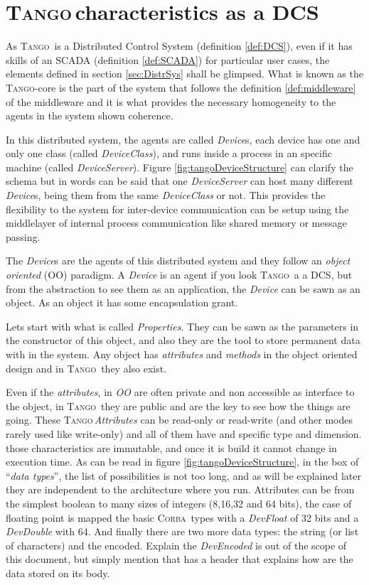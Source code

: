 \documentclass[10pt,a4paper,twoside]{llncs}
\newcommand{\tango}{\textsc{Tango}}
\newcommand{\corba}{\textsc{Corba}}
\begin{document}
\section{\tango\,characteristics as a DCS}\label{sec:characteristics}

As \tango\, is a Distributed Control System (definition \ref{def:DCS}), even if it has skills of an SCADA (definition \ref{def:SCADA}) for particular user cases, the elements defined in section \ref{sec:DistrSys} shall be glimpsed. What is known as the \tango-core is the part of the system that follows the definition \ref{def:middleware} of the middleware and it is what provides the necessary homogeneity to the agents in the system shown coherence.

In this distributed system, the agents are called \emph{Device}s, each device has one and only one class (called \emph{DeviceClass}), and runs inside a process in an specific machine (called \emph{DeviceServer}). Figure \ref{fig:tangoDeviceStructure} can clarify the schema but in words can be said that one \emph{DeviceServer} can host many different \emph{Device}s, being them from the same \emph{DeviceClass} or not. This provides the flexibility to the system for inter-device communication can be setup using the middlelayer of internal process communication like shared memory or message passing.

The \emph{Device}s are the agents of this distributed system and they follow an \emph{object oriented} (OO) paradigm. A \emph{Device} is an agent if you look \tango\, a a DCS, but from the abstraction to see them as an application, the \emph{Device} can be sawn as an object. As an object it has some encapsulation grant.

Lets start with what is called \emph{Properties}. They can be sawn as the parameters in the constructor of this object, and also they are the tool to store permanent data with in the system. Any object has \emph{attributes} and \emph{methods} in the object oriented design and in \tango\, they also exist.

Even if the \emph{attributes}, in \emph{OO} are often private and non accessible as interface to the object, in \tango\, they are public and are the key to see how the things are going. These \tango\,\emph{Attributes} can be read-only or read-write (and other modes rarely used like write-only) and all of them have and specific type and dimension. those characteristics are immutable, and once it is build it cannot change in execution time. As can be read in figure \ref{fig:tangoDeviceStructure}, in the box of ``\emph{data types}'', the list of possibilities is not too long, and as will be explained later they are independent to the architecture where you run. Attributes can be from the simplest boolean to many sizes of integers (8,16,32 and 64 bits), the case of floating point is mapped the basic \corba\, types with a \emph{DevFloat} of 32 bits and a \emph{DevDouble} with 64. And finally there are two more data types: the string (or list of characters) and the encoded. Explain the \emph{DevEncoded} is out of 
the scope of this document, but simply mention that has a header that explains how are the data stored on its body.
\end{document}
